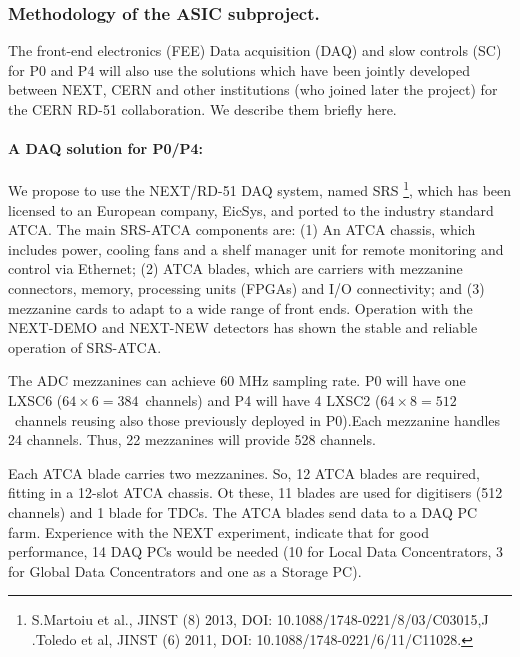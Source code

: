 \subsubsection*{Methodology of the ASIC subproject.}

The front-end electronics (FEE) Data acquisition (DAQ) and slow controls (SC) 
for P0 and P4 will also use the solutions which have been jointly developed between NEXT, CERN and other institutions (who joined later the project) for the CERN RD-51 collaboration. We describe them briefly here. 

\paragraph{A DAQ solution for P0/P4:}
%
We propose to use the NEXT/RD-51 DAQ system, named SRS \footnote{S.Martoiu et al., JINST (8) 2013, DOI: 10.1088/1748-0221/8/03/C03015,J .Toledo et al, JINST (6) 2011, DOI: 10.1088/1748-0221/6/11/C11028.}, which has been licensed to an European company, EicSys, and ported to the industry standard ATCA.
%
The main SRS-ATCA components are: (1) An ATCA chassis, which includes power, cooling fans and a shelf manager unit for remote monitoring and control via Ethernet; (2) ATCA blades, which are carriers with mezzanine connectors, memory, processing units (FPGAs) and I/O connectivity; and (3) mezzanine cards to adapt to a wide range of front ends. Operation with the NEXT-DEMO and NEXT-NEW detectors has shown the stable and reliable operation of SRS-ATCA. 

The ADC mezzanines can achieve 60 MHz sampling rate. P0 will have one LXSC6 ($64 \times 6 = 384$~channels) and P4 will have 4 LXSC2 ($64 \times 8 = 512$~channels reusing also those previously deployed in P0).Each mezzanine handles 24 channels. Thus, 22 mezzanines will provide 528 channels.  

Each ATCA blade carries two mezzanines. So, 12 ATCA blades are required, fitting in a 12-slot  ATCA chassis. Ot these, 11 blades are used for digitisers (512 channels) and 1 blade for TDCs. The ATCA blades send data to a DAQ PC farm. Experience with the NEXT experiment, indicate that for good performance, 14 DAQ PCs would be needed (10 for Local Data Concentrators, 3 for Global Data Concentrators and one as a Storage PC). 

%
